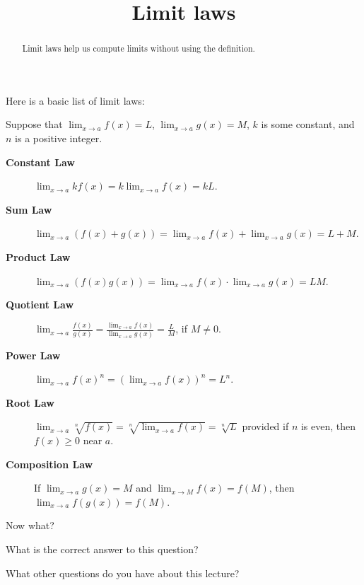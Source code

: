 \documentclass{ximera}
\title{Limit laws}
\begin{document}
\begin{abstract}
  Limit laws help us compute limits without using the definition.
\end{abstract}

\maketitle

Here is a basic list of limit laws:

\begin{theorem}
Suppose that $\lim_{x\to a}f(x)=L$, $\lim_{x\to a}g(x)=M$, $k$
is some constant, and $n$ is a positive integer.
\begin{description}
\item[\textbf{Constant Law}] $\lim_{x\to a} kf(x) = k\lim_{x\to a}f(x)=kL$.
\item[\textbf{Sum Law}] $\lim_{x\to a} (f(x)+g(x)) = \lim_{x\to a}f(x)+\lim_{x\to a}g(x)=L+M$.  
\item[\textbf{Product Law}] $\lim_{x\to a} (f(x)g(x)) = \lim_{x\to a}f(x)\cdot\lim_{x\to a}g(x)=LM$. 
\item[\textbf{Quotient Law}] $\lim_{x\to a} \frac{f(x)}{g(x)} =
  \frac{\lim_{x\to a}f(x)}{\lim_{x\to a}g(x)}=\frac{L}{M}$, if $M\ne0$.
\item[\textbf{Power Law}] $\lim_{x\to a} f(x)^n = \left(\lim_{x\to a}f(x)\right)^n=L^n$.
\item[\textbf{Root Law}] $\lim_{x\to a} \sqrt[n]{f(x)} = \sqrt[n]{\lim_{x\to
    a}f(x)}=\sqrt[n]{L}$ provided if $n$ is even, then $f(x)\ge 0$
  near $a$.
\item[\textbf{Composition Law}] If $\lim_{x\to a}g(x)=M$ and
  $\lim_{x\to M}f(x) = f(M)$, then $\lim_{x\to a} f(g(x)) = f(M)$.
\end{description}
\end{theorem}

Now what?



\begin{question}
  What is the correct answer to this question?
    \begin{multipleChoice}
    \end{multipleChoice}  
\end{question}


\begin{question}
What other questions do you have about this lecture?
\begin{freeResponse}
\end{freeResponse}
\end{question}
\end{document}
